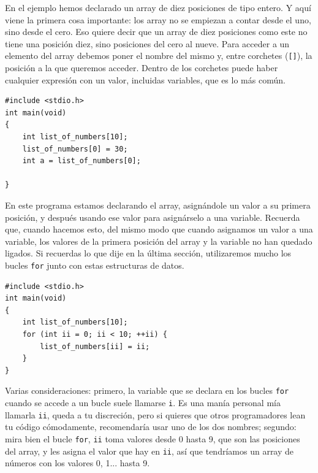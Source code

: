 \documentclass[a4paper]{article}
\begin{document}
En el ejemplo hemos declarado un array de diez posiciones de tipo entero. Y aquí
viene la primera cosa importante: los array no se empiezan a contar desde el
uno, sino desde el cero. Eso quiere decir que un array de diez posiciones
como este no tiene una posición diez, sino posiciones del cero al nueve.
Para acceder a un elemento
del array debemos poner el nombre del mismo y, entre corchetes (\verb![]!), la
posición a la que queremos acceder. Dentro de los corchetes puede haber
cualquier expresión con un valor, incluidas variables, que es lo más común.


\noindent
\begin{minipage}[H]{\linewidth}
\mbox{}
\begin{lstlisting}[style=C,
caption={Ejemplo de uso de array},
label={lst:arrayUse}]
#include <stdio.h>
int main(void)
{
    int list_of_numbers[10];
    list_of_numbers[0] = 30;
    int a = list_of_numbers[0];

}
\end{lstlisting}
\end{minipage}


En este programa estamos declarando el array, asignándole un valor a su primera
posición, y después usando ese valor para asignárselo a una variable. Recuerda
que, cuando hacemos esto, del mismo modo que cuando asignamos un valor a una
variable, los valores de la primera posición del array y la variable no han
quedado ligados. Si recuerdas lo que dije en la última sección, utilizaremos
mucho los bucles \texttt{for} junto con estas estructuras de datos.


\noindent
\begin{minipage}[H]{\linewidth}
\mbox{}
\begin{lstlisting}[style=C,
caption={Ejemplo de uso de array},
label={lst:arrayIteration}]
#include <stdio.h>
int main(void)
{
    int list_of_numbers[10];
    for (int ii = 0; ii < 10; ++ii) {
        list_of_numbers[ii] = ii;
    }
}
\end{lstlisting}
\end{minipage}


Varias consideraciones: primero, la variable que se declara en los bucles
\texttt{for} cuando se accede a un bucle suele llamarse \verb!i!.
Es una manía personal
mía llamarla \texttt{ii}, queda a tu discreción, pero si quieres que otros
programadores lean tu código cómodamente, recomendaría usar uno de los dos
nombres; segundo: mira bien el bucle \texttt{for}, \texttt{ii} toma valores
desde 0 hasta 9, que son las posiciones del array, y les asigna el valor
que hay en \verb!ii!, así que tendríamos un array de números con los valores
0, 1... hasta 9.
\end{document}
